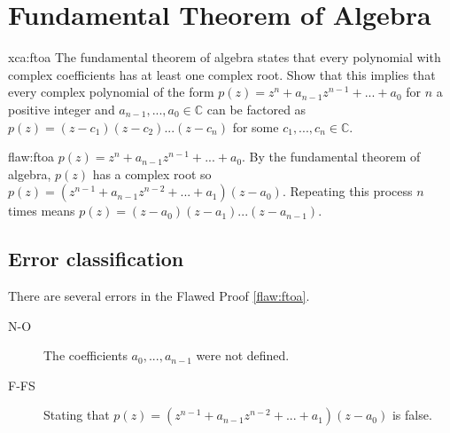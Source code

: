 \section{Fundamental Theorem of Algebra}

\begin{xca}{xca:ftoa}
The fundamental theorem of algebra states that every polynomial with complex coefficients has at least one complex root. Show that this implies that every complex polynomial of the form $p(z) = z^n + a_{n-1}z^{n-1} + ... + a_0$ for $n$ a positive integer and $a_{n-1}, ..., a_0 \in \mathbb{C}$ can be factored as $p(z) = (z-c_1)(z-c_2)...(z-c_n)$ for some $c_1, ..., c_n \in \mathbb{C}$.

\end{xca}

\begin{flaw}{flaw:ftoa} %
$p(z) = z^n + a_{n-1}z^{n-1} + ... + a_0$. By the fundamental theorem of algebra, $p(z)$ has a complex root so $p(z) = (z^{n-1} + a_{n-1}z^{n-2} + ... + a_1)(z-a_0)$. Repeating this process $n$ times means $p(z) = (z-a_0)(z-a_1)...(z-a_{n-1})$.

\end{flaw}

\clearpage
\subsection{Error classification}


There are several errors
 in the Flawed Proof \ref{flaw:ftoa}.

 \begin{description}
    \item[N-O] The coefficients $a_0, ..., a_{n-1}$ were not defined.
    \item[F-FS] Stating that $p(z) = (z^{n-1} + a_{n-1}z^{n-2} + ... + a_1)(z-a_0)$ is false.

 	
 \end{description}


